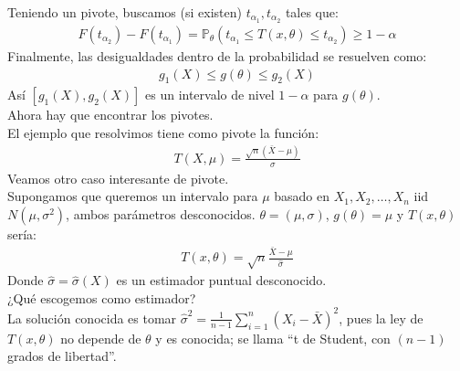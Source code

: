 \documentclass[10pt]{article}
\theoremstyle{plain}
\theoremstyle{definition}
\begin{document}
Teniendo un pivote, buscamos (si existen) $t_{\alpha_{1}}, t_{\alpha_{2}}$ tales que:
\begin{align*}
F(t_{\alpha_{2}})-F(t_{\alpha_{1}}) = \mathbb{P}_{\theta}(t_{\alpha_{1}}\le T(x,\theta)\le t_{\alpha_{2}}) \ge 1-\alpha
\end{align*}
Finalmente, las desigualdades dentro de la probabilidad se resuelven como:
\begin{align*}
g_{1}(X) \le g(\theta) \le g_{2}(X)
\end{align*}
Así $[g_{1}(X),g_{2}(X)]$ es un intervalo de nivel $1-\alpha$ para $g(\theta)$.\\
Ahora hay que encontrar los pivotes.\\

El ejemplo que resolvimos tiene como pivote la función:
\begin{align*}
T(X,\mu) = \frac{\sqrt{n}(\bar{X}-\mu)}{\sigma}
\end{align*}
Veamos otro caso interesante de pivote.\\
Supongamos que queremos un intervalo para $\mu$ basado en $X_{1},X_{2},\ldots,X_{n}$ iid $N(\mu,\sigma^2)$, ambos parámetros desconocidos. $\theta = (\mu,\sigma)$, $g(\theta) = \mu$ y $T(x,\theta)$ sería:
\begin{align*}
T(x,\theta) = \sqrt{n}\frac{\bar{X}-\mu}{\hat{\sigma}}
\end{align*}
Donde $\hat{\sigma} = \hat{\sigma}(X)$ es un estimador puntual desconocido.\\

¿Qué escogemos como estimador?\\
La solución conocida es tomar $\hat{\sigma}^2 = \frac{1}{n-1}\sum_{i=1}^n {(X_{i}-\bar{X})^2}$, pues la ley de $T(x,\theta)$ no depende de $\theta$ y es conocida; se llama ``t de Student, con $(n-1)$ grados de libertad''.
\end{document}
